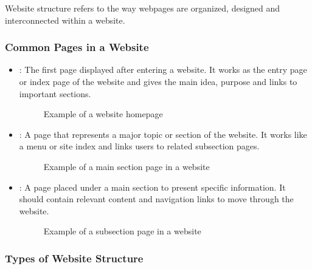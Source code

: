 \begin{definitionbox}
Website structure refers to the way webpages are organized, designed and interconnected within a website.
\end{definitionbox}

\subsubsection{Common Pages in a Website}

\begin{itemize}
    \item {}: The first page displayed after entering a website. It works as the entry page or index page of the website and gives the main idea, purpose and links to important sections.

    \begin{figure}[H]
        \centering
        \caption{Example of a website homepage}
        \label{fig:website-homepage}
    \end{figure}
    
    \item {}: A page that represents a major topic or section of the website. It works like a menu or site index and links users to related subsection pages.

    \begin{figure}[H]
        \centering
        \caption{Example of a main section page in a website}
        \label{fig:website-main-section-page}
    \end{figure}
    
    \item {}: A page placed under a main section to present specific information. It should contain relevant content and navigation links to move through the website.

    \begin{figure}[H]
        \centering
        \caption{Example of a subsection page in a website}
        \label{fig:website-subsection-page}
    \end{figure}
\end{itemize}

\subsubsection{Types of Website Structure}

